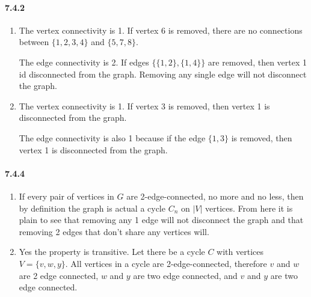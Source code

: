 \documentclass[11pt, letterpaper, twocolumn, fleqn]{article}
\begin{document}
\paragraph{7.4.2}
\begin{enumerate}
  \item The vertex connectivity is 1. If vertex 6 is removed, there are no connections between $\{1,2,3,4\}$ and $\{5,7,8\}$.
  
  The edge connectivity is 2. If edges $\{\{1,2\},\{1,4\}\}$ are removed, then vertex 1 id disconnected from the graph. Removing any single edge will not disconnect the graph.
  
  \item The vertex connectivity is 1. If vertex 3 is removed, then vertex 1 is disconnected from the graph. 
  
  The edge connectivity is also 1 because if the edge $\{1,3\}$ is removed, then vertex 1 is disconnected from the graph.
\end{enumerate}

\paragraph{7.4.4}
\begin{enumerate}
  \item If every pair of vertices in $G$ are 2-edge-connected, no more and no less, then by definition the graph is actual a cycle $C_n$ on $|V|$ vertices. From here it is plain to see that removing any 1 edge will not disconnect the graph and that removing 2 edges that don't share any vertices will.
  
  \item Yes the property is transitive. Let there be a cycle $C$ with vertices $V = \{v,w,y\}$. All vertices in a cycle are 2-edge-connected, therefore $v$ and $w$ are 2 edge connected, $w$ and $y$ are two edge connected, and $v$ and $y$ are two edge connected.
\end{enumerate}
\end{document}
